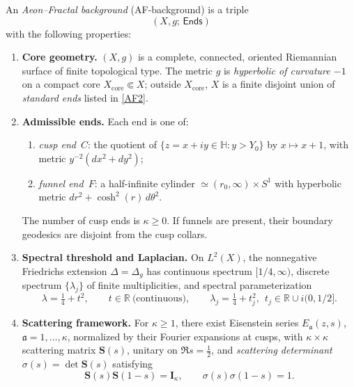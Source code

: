 \begin{definition}\label{def:AF-geo}
An \emph{Aeon–Fractal background} (AF-background) is a triple
\[
(X,g;\,\mathsf{Ends})
\]
with the following properties:
\begin{enumerate}[label=\textup{(AF\arabic*)}, leftmargin=2.2em]
  \item\label{AF1} \textbf{Core geometry.} $(X,g)$ is a complete, connected, oriented Riemannian surface of finite topological type. The metric $g$ is \emph{hyperbolic of curvature $-1$} on a compact core $X_{\mathrm{core}}\Subset X$; outside $X_{\mathrm{core}}$, $X$ is a finite disjoint union of \emph{standard ends} listed in \ref{AF2}. \relax\hspace{0pt}
  \item\label{AF2} \textbf{Admissible ends.} Each end is one of:
  \begin{enumerate}[label=\textup{(\alph*)}]
     \item \emph{cusp end}~$C$: the quotient of $\{z=x+iy\in\mathbb{H}: y>Y_0\}$ by $x\mapsto x+1$, with metric $y^{-2}(dx^2+dy^2)$;
     \item \emph{funnel end}~$F$: a half-infinite cylinder $\simeq (r_0,\infty)\times S^1$ with hyperbolic metric $dr^2+\cosh^2(r)\,d\theta^2$.
  \end{enumerate}
  The number of cusp ends is $\kappa\ge 0$. If funnels are present, their boundary geodesics are disjoint from the cusp collars. \relax\hspace{0pt}
  \item\label{AF3} \textbf{Spectral threshold and Laplacian.} On $L^2(X)$, the nonnegative Friedrichs extension $\Delta=\Delta_g$ has continuous spectrum $[1/4,\infty)$, discrete spectrum $\{\lambda_j\}$ of finite multiplicities, and spectral parameterization
  \[
  \lambda=\tfrac14+t^2,\qquad t\in\mathbb{R}\ \text{(continuous)},\qquad
  \lambda_j=\tfrac14+t_j^2,\ \ t_j\in\mathbb{R}\cup i(0,1/2].
  \]
  \item\label{AF4} \textbf{Scattering framework.} For $\kappa\ge 1$, there exist Eisenstein series $E_{\mathfrak a}(z,s)$, $\mathfrak a=1,\dots,\kappa$, normalized by their Fourier expansions at cusps, with $\kappa\times\kappa$ scattering matrix $\mathbf{S}(s)$, unitary on $\Re s=\frac12$, and \emph{scattering determinant} $\sigma(s)=\det\mathbf{S}(s)$ satisfying
  \[
  \mathbf{S}(s)\mathbf{S}(1-s)=\mathbf{I}_\kappa,\qquad \sigma(s)\sigma(1-s)=1.
  \]
\end{enumerate}
\end{definition}

